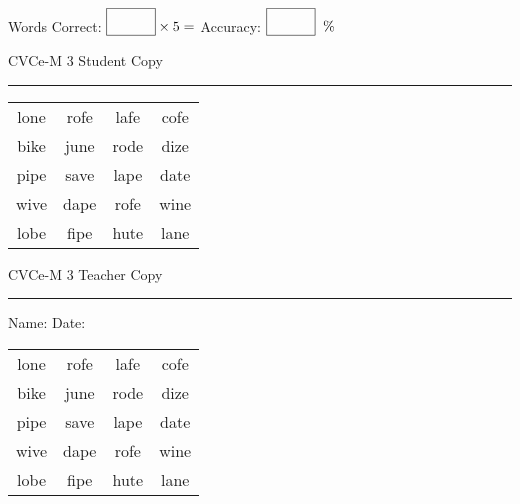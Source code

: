 \documentclass{memoir}
\begin{document}
\small

Words Correct: $\fbox{\phantom{\huge 100}} \times 5 = $ Accuracy: $\fbox{\phantom{\huge 100}}\;\; \%$ 

\vfill

\newpage


\footnotesize \noindent
CVCe-M 3 \hfill Student Copy
\smallskip
\hrule

\Large

\setlength{\tabcolsep}{14pt}
\def\arraystretch{2}

{\selectfont


\begin{vplace}[0.5]
\begin{center}
\begin{tabular}{cccc}
lone & rofe & lafe & cofe \\
bike & june & rode & dize \\
pipe & save & lape & date \\
wive & dape & rofe & wine \\
lobe & fipe & hute & lane \\
\end{tabular}
\end{center}
\end{vplace}

}

\newpage

\footnotesize \noindent
CVCe-M 3 \hfill Teacher Copy
\smallskip
\hrule

\small

\vfill

\noindent
Name: \underline{\hspace{1.75in}} \hfill Date: \underline{\hspace{1in}}

\Large

{\selectfont


\begin{vplace}[0.5]
\begin{center}
\begin{tabular}{cccc}
lone & rofe & lafe & cofe \\
bike & june & rode & dize \\
pipe & save & lape & date \\
wive & dape & rofe & wine \\
lobe & fipe & hute & lane \\
\end{tabular}
\end{center}
\end{vplace}



}
\end{document}
